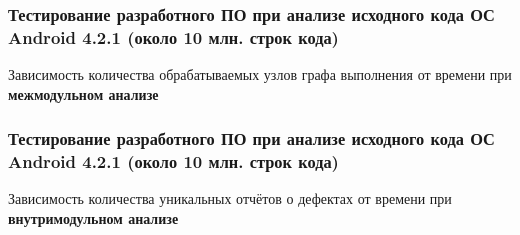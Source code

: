 \documentclass[hyperref={pdfpagelabels=false},10pt,gray]{beamer}
\begin{document}
\begin{frame}
\frametitle{Тестирование разработного ПО при анализе исходного кода ОС Android 4.2.1 (около 10 млн. строк кода)}
Зависимость количества обрабатываемых узлов графа выполнения от времени  при \textbf{межмодульном анализе}
\begin{figure}[h]
\end{figure}
\end{frame}

\begin{frame}
\frametitle{Тестирование разработного ПО при анализе исходного кода ОС Android 4.2.1 (около 10 млн. строк кода)}
Зависимость количества уникальных отчётов о дефектах от времени  при \textbf{внутримодульном анализе}
\begin{figure}[h]
\end{figure}
\end{frame}
\end{document}
